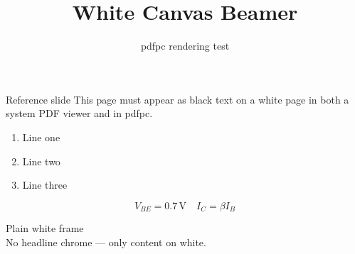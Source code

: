 \documentclass[aspectratio=169]{beamer}
\title{White Canvas Beamer}
\author{pdfpc rendering test}
\begin{document}
\begin{frame}
  \titlepage
\end{frame}

\begin{frame}{Reference slide}
  This page must appear as black text on a white page in both
  a system PDF viewer and in pdfpc.
  \begin{enumerate}
    \item Line one
    \item Line two
    \item Line three
  \end{enumerate}
  \[
    V_{BE} = 0.7\,\mathrm{V} \quad I_C = \beta I_B
  \]
\end{frame}

\begin{frame}[plain]
  \centering
  \vspace{2cm}
  {\Huge Plain white frame}\\[1em]
  No headline chrome — only content on white.
\end{frame}
\end{document}
